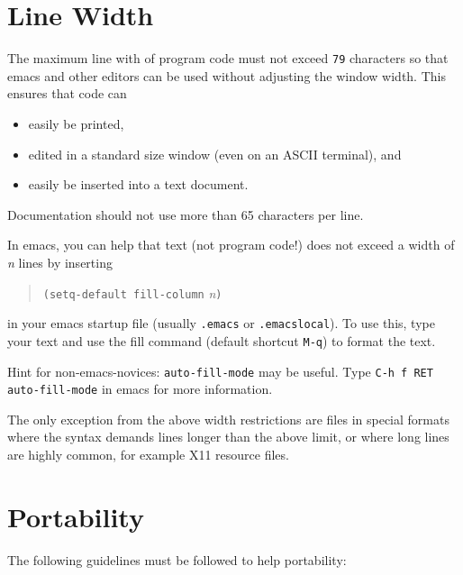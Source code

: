 %
%

\section{Line Width}

 The maximum line with of program code must not
exceed \texttt{79} characters so that emacs and other editors can
be used without adjusting the window width. This ensures that
code can

\begin{itemize}
  \item easily be printed,
  \item edited in a standard size window (even on an ASCII terminal), and
  \item easily be inserted into a text document.
\end{itemize}

\noindent Documentation should not use more than 65 characters per line.

\begin{notes}
  \item In emacs, you can help that text (not program code!)
  does not exceed a width of \emph{n} lines by inserting
  \begin{quote}
    \texttt{(setq-default fill-column} \emph{n}\texttt{)}
  \end{quote}
  in your emacs startup file (usually \texttt{.emacs} or
  \texttt{.emacslocal}).  To use this, type your text and use the
  fill command (default shortcut \texttt{M-q}) to format the text.
  
  \item Hint for non-emacs-novices: \texttt{auto-fill-mode} may
  be useful.  Type \texttt{C-h f RET auto-fill-mode} in emacs for
  more information.

\end{notes}

The only exception from the above width restrictions are files in
special formats where the syntax demands lines longer than the
above limit, or where long lines are highly common, for example
X11 resource files.


%
%

\section{Portability}

 The following guidelines must be followed to help
portability:

